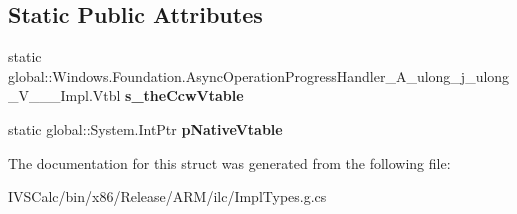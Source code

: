 \subsection*{Static Public Attributes}
\begin{DoxyCompactItemize}
\item 
\mbox{\label{struct_windows_1_1_foundation_1_1_async_operation_progress_handler___a__ulong__j__ulong___v_______impl_1_1_vtbl_ae7bc16d84eed72c7d4b105c9ed799cf9}} 
static global\+::\+Windows.\+Foundation.\+Async\+Operation\+Progress\+Handler\+\_\+\+A\+\_\+ulong\+\_\+j\+\_\+ulong\+\_\+\+V\+\_\+\+\_\+\+\_\+\+Impl.\+Vtbl {\bfseries s\+\_\+the\+Ccw\+Vtable}
\item 
\mbox{\label{struct_windows_1_1_foundation_1_1_async_operation_progress_handler___a__ulong__j__ulong___v_______impl_1_1_vtbl_a8924098427c06f347e27d82cf147eec8}} 
static global\+::\+System.\+Int\+Ptr {\bfseries p\+Native\+Vtable}
\end{DoxyCompactItemize}


The documentation for this struct was generated from the following file\+:\begin{DoxyCompactItemize}
\item 
I\+V\+S\+Calc/bin/x86/\+Release/\+A\+R\+M/ilc/Impl\+Types.\+g.\+cs\end{DoxyCompactItemize}
